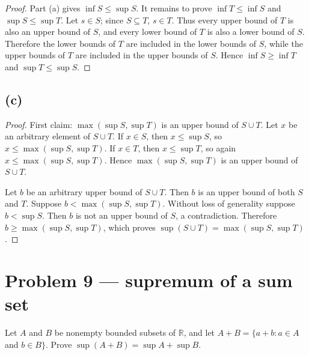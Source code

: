 \begin{proof}

Part (a) gives \(\inf S \leq \sup S\). It remains to prove \(\inf T \leq \inf S\) and \(\sup S \leq \sup T\). Let \(s \in S\); since \(S \subseteq T\), \(s \in T\). Thus every upper bound of \(T\) is also an upper bound of \(S\), and every lower bound of \(T\) is also a lower bound of \(S\). Therefore the lower bounds of \(T\) are included in the lower bounds of \(S\), while the upper bounds of \(T\) are included in the upper bounds of \(S\). Hence \(\inf S \geq \inf T\) and \(\sup T \leq \sup S\).

\end{proof}

\subsection{(c)}

\begin{proof}

First claim: \(\max\left( {\sup S,\sup T} \right)\) is an upper bound of \(S \cup T\). Let \(x\) be an arbitrary element of \(S \cup T\). If \(x \in S\), then \(x \leq \sup S\), so \(x \leq \max\left( {\sup S,\sup T} \right)\). If \(x \in T\), then \(x \leq \sup T\), so again \(x \leq \max\left( {\sup S,\sup T} \right)\). Hence \(\max\left( {\sup S,\sup T} \right)\) is an upper bound of \(S \cup T\).

Let \(b\) be an arbitrary upper bound of \(S \cup T\). Then \(b\) is an upper bound of both \(S\) and \(T\). Suppose \(b < \max\left( {\sup S,\sup T} \right)\). Without loss of generality suppose \(b < \sup S\). Then \(b\) is not an upper bound of \(S\), a contradiction. Therefore \(b \geq \max\left( {\sup S,\sup T} \right)\), which proves \(\sup\left( {S \cup T} \right) = \max\left( {\sup S,\sup T} \right)\).

\end{proof}

\section{Problem 9 --- supremum of a sum set}

Let \(A\) and \(B\) be nonempty bounded subsets of \(\mathbb{R}\), and let \(A + B = \{ a + b:a \in A\) and \(b \in B\}\). Prove \(\sup\left( {A + B} \right) = \sup A + \sup B\).

